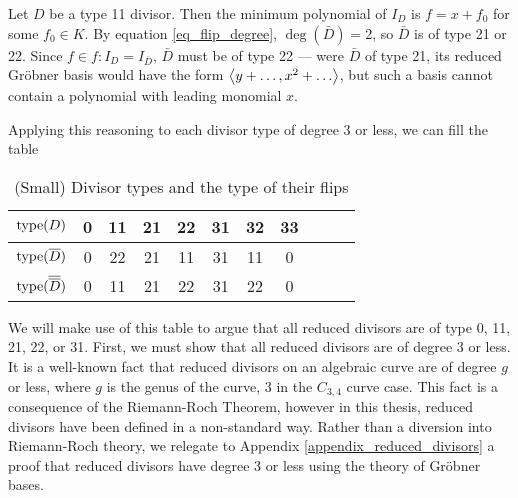 \begin{example}
  Let $D$ be a type 11 divisor.
  Then the minimum polynomial of $I_D$ is $f = x + f_0$ for some $f_0 \in K$.
  By equation \ref{eq_flip_degree}, $\deg(\bar D) = 2$, so $\bar D$ is of type 21 or 22.
  Since $f \in f : I_D = I_{\bar D}$, $\bar D$ must be of type 22 ---
  were $\bar D$ of type 21, its reduced Gr\"obner basis would have the form $\left\langle y + \ldots, x^2 + \ldots \right\rangle$,
  but such a basis cannot contain a polynomial with leading monomial $x$.
\end{example}

Applying this reasoning to each divisor type of degree 3 or less,
we can fill the table
\begin{table}[h]
\caption{(Small) Divisor types and the type of their flips}
\label{tab_small_flip_type}
\begin{center}
  \begin{tabular}{r|cccccccccc}
    $\operatorname{type}(D)$             & 0 & 11 & 21 & 22 & 31 & 32 & 33 \\
    \hline
    $\operatorname{type}(\overline D)$        & 0 & 22 & 21 & 11 & 31 & 11 & 0 \\
    $\operatorname{type}(\overline {\overline D})$ & 0 & 11 & 21 & 22 & 31 & 22 & 0
  \end{tabular}
\end{center}
\end{table}

We will make use of this table to argue that all reduced divisors are of type 0, 11, 21, 22, or 31.
First, we must show that all reduced divisors are of degree 3 or less.
It is a well-known fact that reduced divisors on an algebraic curve are of degree $g$ or less,
where $g$ is the genus of the curve, 3 in the $C_{3,4}$ curve case.
This fact is a consequence of the Riemann-Roch Theorem,
however in this thesis, reduced divisors have been defined in a non-standard way.
Rather than a diversion into Riemann-Roch theory,
we relegate to Appendix \ref{appendix_reduced_divisors}
a proof that reduced divisors have degree 3 or less using the theory of Gr\"obner bases.

